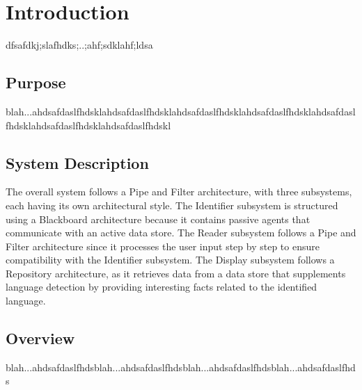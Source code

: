 \section{Introduction}
\label{sec:introduction}
dfsafdkj;slafhdks;..;ahf;sdklahf;ldsa

\subsection{Purpose}
\label{sub:purpose}
blah...ahdsafdaslfhdsklahdsafdaslfhdsklahdsafdaslfhdsklahdsafdaslfhdsklahdsafdaslfhdsklahdsafdaslfhdsklahdsafdaslfhdskl


\subsection{System Description}
\label{sub:system_description}
The overall system follows a Pipe and Filter architecture, with three subsystems, each having its own architectural style. The Identifier subsystem is structured using a Blackboard architecture because it contains passive agents that communicate with an active data store. The Reader subsystem follows a Pipe and Filter architecture since it processes the user input step by step to ensure compatibility with the Identifier subsystem. The Display subsystem follows a Repository architecture, as it retrieves data from a data store that supplements language detection by providing interesting facts related to the identified language.


\subsection{Overview}
\label{sub:overview}
blah...ahdsafdaslfhdsblah...ahdsafdaslfhdsblah...ahdsafdaslfhdsblah...ahdsafdaslfhds


